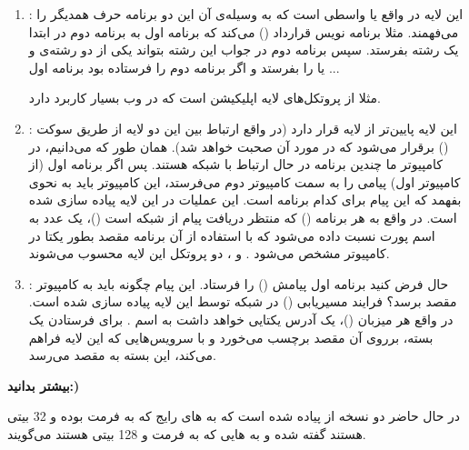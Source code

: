 \documentclass[]{article}
\begin{document}
\begin{enumerate}

\item
\textbf{}:  این لایه در واقع  یا واسطی است که به وسیله‌ی آن این دو برنامه حرف همدیگر را می‌فهمند. مثلا برنامه نویس قرارداد () می‌کند که برنامه اول به برنامه دوم در ابتدا یک رشته  بفرستد. سپس برنامه دوم در جواب این رشته بتواند یکی از دو رشته‌ی  و یا  را بفرستد و اگر برنامه دوم  را فرستاده بود برنامه اول ...

مثلا  از پروتکل‌های لایه اپلیکیشن است که در وب بسیار کاربرد دارد.


\item
\textbf{}: این لایه پایین‌تر از لایه  قرار دارد (‌در واقع ارتباط بین این دو لایه از طریق سوکت () برقرار می‌شود که در مورد آن صحبت خواهد شد). همان طور که می‌دانیم، در کامپیوتر ما چندین برنامه در حال ارتباط با شبکه هستند. پس اگر برنامه اول (از کامپیوتر اول) پیامی را به سمت کامپیوتر دوم می‌فرستد، این کامپیوتر باید به نحوی بفهمد که این پیام برای کدام برنامه است. این عملیات در این لایه پیاده سازی شده است. در واقع به هر برنامه () که منتظر دریافت پیام از شبکه است ()‌، یک عدد به اسم پورت نسبت داده می‌شود که با استفاده از آن برنامه مقصد بطور یکتا در کامپیوتر مشخص می‌شود . و ، دو پروتکل این لایه محسوب می‌شوند.


\item
\textbf{}: حال فرض کنید برنامه اول پیامش () را فرستاد. این پیام چگونه باید به کامپیوتر مقصد برسد؟ فرایند مسیریابی () در شبکه توسط این لایه پیاده سازی شده است. در واقع هر میزبان ()‌، یک آدرس یکتایی خواهد داشت به اسم . برای فرستادن یک بسته، برروی آن  مقصد برچسب می‌خورد و با سرویس‌هایی که این لایه فراهم می‌کند، این بسته به مقصد می‌رسد.

\end{enumerate}

\textbf{بیشتر بدانید:) }


در حال حاضر دو نسخه از  پیاده شده است که به  های رایج که به فرمت  بوده و 32 بیتی هستند  گفته شده و به  هایی که به فرمت  و 128 بیتی هستند  می‌گویند.
\end{document}
